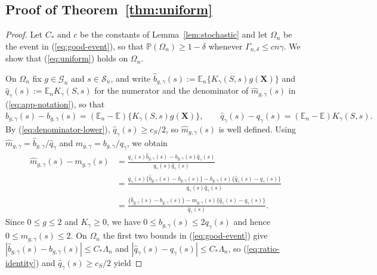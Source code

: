 \documentclass{article} %
\begin{document}
\subsection{Proof of Theorem~\ref{thm:uniform}}
\label{app:proof-uniform}

\begin{proof}
Let $C_\ast$ and $c$ be the constants of Lemma~\ref{lem:stochastic} and let $\Omega_n$ be the event in (\ref{eq:good-event}), so that $\mathbb{P}(\Omega_n)\ge1-\delta$ whenever $\Gamma_{n,\delta}\le cn\gamma$.  We show that (\ref{eq:uniform}) holds on $\Omega_n$.

On $\Omega_n$ fix $g\in\mathcal{G}_n$ and $s\in\mathcal{S}_n$, and write $\widehat{b}_{g,\gamma}(s):=\mathbb{E}_n\{K_{\gamma}(S,s)g(\mathbf{X})\}$ and $\widehat{q}_{\gamma}(s):=\mathbb{E}_nK_{\gamma}(S,s)$ for the numerator and the denominator of $\widehat{m}_{g,\gamma}(s)$ in (\ref{eq:app-notation}), so that
\[
  \widehat{b}_{g,\gamma}(s)-b_{g,\gamma}(s)=(\mathbb{E}_n-\mathbb{E})\{K_{\gamma}(S,s)g(\mathbf{X})\},
  \qquad
  \widehat{q}_{\gamma}(s)-q_{\gamma}(s)=(\mathbb{E}_n-\mathbb{E})K_{\gamma}(S,s) .
\]
By (\ref{eq:denominator-lower}), $\widehat{q}_{\gamma}(s)\ge c_S/2$, so $\widehat{m}_{g,\gamma}(s)$ is well defined.  Using $\widehat{m}_{g,\gamma}=\widehat{b}_{g,\gamma}/\widehat{q}_{\gamma}$ and $m_{g,\gamma}=b_{g,\gamma}/q_{\gamma}$, we obtain
\begin{equation}
\begin{aligned}
  \widehat{m}_{g,\gamma}(s)-m_{g,\gamma}(s)
  &=\frac{q_{\gamma}(s)\widehat{b}_{g,\gamma}(s)-b_{g,\gamma}(s)\widehat{q}_{\gamma}(s)}
        {q_{\gamma}(s)\widehat{q}_{\gamma}(s)}
  \\
  &=\frac{q_{\gamma}(s)\{\widehat{b}_{g,\gamma}(s)-b_{g,\gamma}(s)\}
         -b_{g,\gamma}(s)\{\widehat{q}_{\gamma}(s)-q_{\gamma}(s)\}}
        {q_{\gamma}(s)\widehat{q}_{\gamma}(s)}
  \\
  &=\frac{\{\widehat{b}_{g,\gamma}(s)-b_{g,\gamma}(s)\}
          -m_{g,\gamma}(s)\{\widehat{q}_{\gamma}(s)-q_{\gamma}(s)\}}
         {\widehat{q}_{\gamma}(s)} .
\end{aligned}
  \label{eq:ratio-identity}
\end{equation}
 Since $0\le g\le2$ and $K_{\gamma}\ge0$, we have $0\le b_{g,\gamma}(s)\le2q_{\gamma}(s)$ and hence $0\le m_{g,\gamma}(s)\le2$.  On $\Omega_n$ the first two bounds in (\ref{eq:good-event}) give $|\widehat{b}_{g,\gamma}(s)-b_{g,\gamma}(s)|\le C_\ast\Lambda_n$ and $|\widehat{q}_{\gamma}(s)-q_{\gamma}(s)|\le C_\ast\Lambda_n$, so (\ref{eq:ratio-identity}) and $\widehat{q}_{\gamma}(s)\ge c_S/2$ yield

\end{proof}
\end{document}
